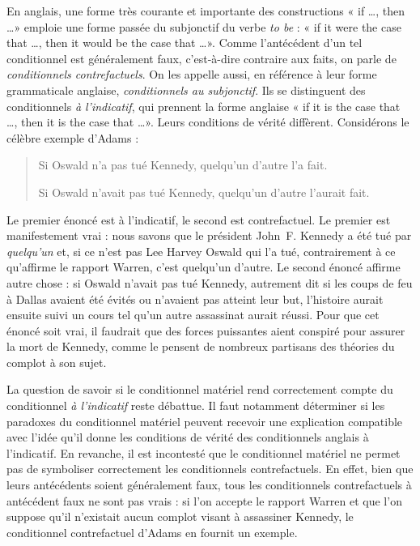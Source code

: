 \documentclass[../../../include/open-logic-section]{subfiles}
\begin{document}


En anglais, une forme très courante et importante des constructions
« if \dots, then \dots » emploie une forme passée du subjonctif du
verbe \emph{to be} : « if it were the case that \dots, then it would
be the case that \dots ». Comme l'antécédent d'un tel conditionnel est
généralement faux, c'est-à-dire contraire aux faits, on parle de
\emph{conditionnels contrefactuels}. On les appelle aussi, en référence
à leur forme grammaticale anglaise, \emph{conditionnels au
  subjonctif}. Ils se distinguent des conditionnels \emph{à l'indicatif}, qui prennent la
forme anglaise « if it is the case that \dots, then it is the case
that \dots ». Leurs conditions de vérité diffèrent. Considérons le
célèbre exemple d'Adams :
\begin{quote}
  Si Oswald n'a pas tué Kennedy, quelqu'un d'autre l'a fait.

  Si Oswald n'avait pas tué Kennedy, quelqu'un d'autre l'aurait fait.
\end{quote}
Le premier énoncé est à l'indicatif, le second est contrefactuel. Le
premier est manifestement vrai : nous savons que le président
John~F. Kennedy a été tué par \emph{quelqu'un} et, si ce n'est pas
Lee Harvey Oswald qui l'a tué, contrairement à ce qu'affirme le
rapport Warren, c'est quelqu'un d'autre. Le second énoncé affirme
autre chose : si Oswald n'avait pas tué Kennedy, autrement dit si les
coups de feu à Dallas avaient été évités ou n'avaient pas atteint leur
but, l'histoire aurait ensuite suivi un cours tel qu'un autre
assassinat aurait réussi. Pour que cet énoncé soit vrai, il faudrait
que des forces puissantes aient conspiré pour assurer la mort de
Kennedy, comme le pensent de nombreux partisans des théories du
complot à son sujet.

La question de savoir si le conditionnel matériel rend correctement
compte du conditionnel \emph{à l'indicatif} reste débattue. Il faut
notamment déterminer si les paradoxes du conditionnel matériel
peuvent recevoir une explication compatible avec l'idée qu'il donne
les conditions de vérité des conditionnels anglais à l'indicatif. En
revanche, il est incontesté que le conditionnel matériel ne permet
pas de symboliser correctement les conditionnels contrefactuels. En
effet, bien que leurs antécédents soient généralement faux, tous les
conditionnels contrefactuels à antécédent faux ne sont pas vrais : si
l'on accepte le rapport Warren et que l'on suppose qu'il n'existait
aucun complot visant à assassiner Kennedy, le conditionnel
contrefactuel d'Adams en fournit un exemple.
\end{document}
